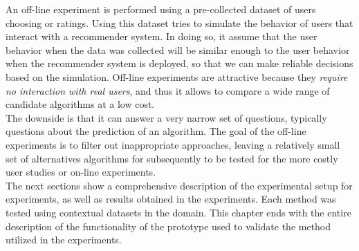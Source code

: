An off-line experiment is performed using a pre-collected dataset
of users choosing or ratings. Using this dataset tries to simulate
the behavior of users that interact with a recommender system. In
doing so, it assume that the user behavior when the data was collected
will be similar enough to the user behavior when the recommender
system is deployed, so that we can make reliable decisions based on
the simulation.  Off-line experiments are attractive because they
\textit{require no interaction with real users}, and thus it allows to compare
a wide range of candidate algorithms at a low cost. \\ The downside is
that it can answer a very narrow set of questions, typically questions
about the prediction of an algorithm. The goal of the off-line
experiments is to filter out inappropriate  approaches, leaving a
relatively small set of alternatives algorithms for subsequently to be
tested for the more costly user studies or on-line 
experiments\cite{adomavicius2011context}.\\ 

The next sections show a comprehensive description of the 
experimental setup for experiments, as well as results obtained 
in the experiments. Each method was tested using contextual 
datasets in the domain.  This chapter ends with the entire 
description of the functionality of the prototype used to 
validate the method utilized in the experiments.
